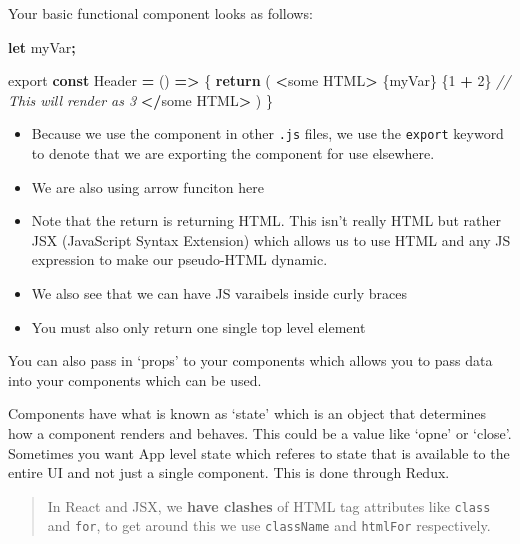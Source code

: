 \documentclass[
]{report}
\newenvironment{Shaded}{\begin{snugshade}}{\end{snugshade}}
\newcommand{\CommentTok}[1]{\textcolor[rgb]{0.56,0.35,0.01}{\textit{#1}}}
\newcommand{\ControlFlowTok}[1]{\textcolor[rgb]{0.13,0.29,0.53}{\textbf{#1}}}
\newcommand{\DecValTok}[1]{\textcolor[rgb]{0.00,0.00,0.81}{#1}}
\newcommand{\ImportTok}[1]{#1}
\newcommand{\KeywordTok}[1]{\textcolor[rgb]{0.13,0.29,0.53}{\textbf{#1}}}
\newcommand{\NormalTok}[1]{#1}
\newcommand{\OperatorTok}[1]{\textcolor[rgb]{0.81,0.36,0.00}{\textbf{#1}}}
\providecommand{\tightlist}{%
  \setlength{\itemsep}{0pt}\setlength{\parskip}{0pt}}
\theoremstyle{definition}
\theoremstyle{definition}
\theoremstyle{definition}
\theoremstyle{definition}
\theoremstyle{remark}
\begin{document}
Your basic functional component looks as follows:

\begin{Shaded}
\begin{Highlighting}[]
\KeywordTok{let}\NormalTok{ myVar}\OperatorTok{;}

\ImportTok{export} \KeywordTok{const}\NormalTok{ Header }\OperatorTok{=}\NormalTok{ () }\KeywordTok{=\textgreater{}}\NormalTok{ \{}
    \ControlFlowTok{return}\NormalTok{ (}
        \OperatorTok{\textless{}}\NormalTok{some HTML}\OperatorTok{\textgreater{}}
\NormalTok{            \{myVar\}}
\NormalTok{            \{}\DecValTok{1} \OperatorTok{+} \DecValTok{2}\NormalTok{\} }\CommentTok{// This will render as 3}
        \OperatorTok{\textless{}/}\NormalTok{some HTML}\OperatorTok{\textgreater{}}
\NormalTok{    )}
\NormalTok{\}}
\end{Highlighting}
\end{Shaded}

\begin{itemize}
\tightlist
\item
  Because we use the component in other \texttt{.js} files, we use the \texttt{export} keyword to denote that we are exporting the component for use elsewhere.
\item
  We are also using arrow funciton here
\item
  Note that the return is returning HTML. This isn't really HTML but rather JSX (JavaScript Syntax Extension) which allows us to use HTML and any JS expression to make our pseudo-HTML dynamic.
\item
  We also see that we can have JS varaibels inside curly braces
\item
  You must also only return one single top level element
\end{itemize}

You can also pass in `props' to your components which allows you to pass data into your components which can be used.

Components have what is known as `state' which is an object that determines how a component renders and behaves. This could be a value like `opne' or `close'. Sometimes you want App level state which referes to state that is available to the entire UI and not just a single component. This is done through Redux.

\begin{quote}
In React and JSX, we \textbf{have clashes} of HTML tag attributes like \texttt{class} and \texttt{for}, to get around this we use \texttt{className} and \texttt{htmlFor} respectively.
\end{quote}
\end{document}
